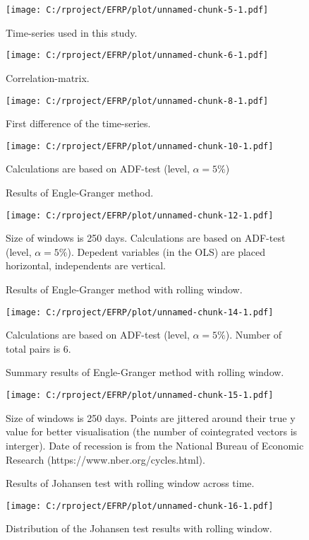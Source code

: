 \documentclass[12pt, a4paper, twoside, titlepage]{article}
\begin{document}
\begin{figure}[ht]
  \centering
  \texttt{[image: C:/rproject/EFRP/plot/unnamed-chunk-5-1.pdf]}
  \caption{Time-series used in this study.}
  \label{fig1}
\end{figure}

\begin{figure}[ht]
  \centering
  \texttt{[image: C:/rproject/EFRP/plot/unnamed-chunk-6-1.pdf]}
  \caption{Correlation-matrix.}
  \label{fig2}
\end{figure}

\begin{figure}[ht]
  \centering
  \texttt{[image: C:/rproject/EFRP/plot/unnamed-chunk-8-1.pdf]}
  \caption{First difference of the time-series.}
  \label{fig3}
\end{figure}

\begin{figure}[ht]
  \centering
  \texttt{[image: C:/rproject/EFRP/plot/unnamed-chunk-10-1.pdf]}
  \caption{Results of Engle-Granger method.}
  \label{fig4}
  Calculations are based on ADF-test (level, $\alpha = 5\%$)
\end{figure}

\begin{figure}[ht]
  \centering
  \texttt{[image: C:/rproject/EFRP/plot/unnamed-chunk-12-1.pdf]}
  \caption{Results of Engle-Granger method with rolling window.}
  \label{fig5}
  Size of windows is 250 days. Calculations are based on ADF-test (level, $\alpha = 5\%$). Depedent variables (in the OLS) are placed horizontal, independents are vertical.
\end{figure}

\begin{figure}[ht]
  \centering
  \texttt{[image: C:/rproject/EFRP/plot/unnamed-chunk-14-1.pdf]}
  \caption{Summary results of Engle-Granger method with rolling window.}
  \label{fig6}
  Calculations are based on ADF-test (level, $\alpha = 5\%$). Number of total pairs is 6.
\end{figure}

\begin{figure}[ht]
  \centering
  \texttt{[image: C:/rproject/EFRP/plot/unnamed-chunk-15-1.pdf]}
  \caption{Results of Johansen test with rolling window across time.}
  \label{fig7}
  Size of windows is 250 days. Points are jittered around their true y value for better visualisation (the number of cointegrated vectors is interger). Date of recession is from the National Bureau of Economic Research (https://www.nber.org/cycles.html).
\end{figure}

\begin{figure}[ht]
  \centering
  \texttt{[image: C:/rproject/EFRP/plot/unnamed-chunk-16-1.pdf]}
  \caption{Distribution of the Johansen test results with rolling window.}
  \label{fig8}
\end{figure}

\begin{appendix}
  \listoffigures
  \listoftables
\end{appendix}



\end{document}

